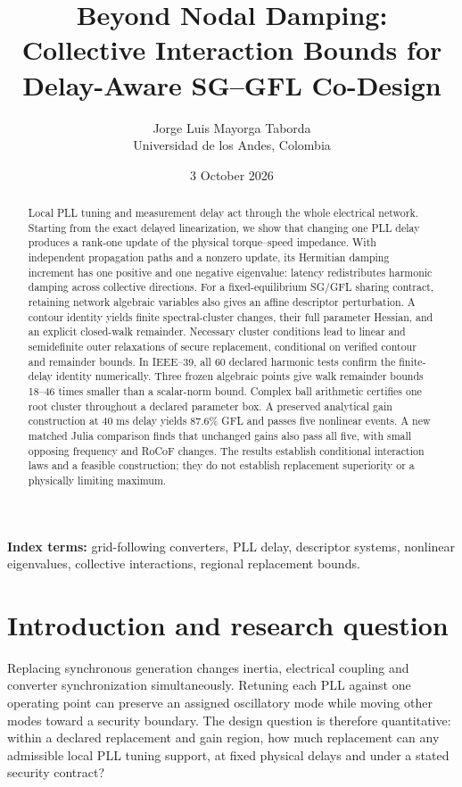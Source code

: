 \documentclass[11pt]{article}
\title{Beyond Nodal Damping:\\Collective Interaction Bounds for Delay-Aware SG--GFL Co-Design}
\author{Jorge Luis Mayorga Taborda\\Universidad de los Andes, Colombia}
\date{3 October 2026}
\begin{document}
\maketitle
\begin{abstract}
Local PLL tuning and measurement delay act through the whole electrical
network. Starting from the exact delayed linearization, we show that
changing one PLL delay produces a rank-one update of the physical
torque--speed impedance. With independent propagation paths and a
nonzero update, its Hermitian damping increment has one positive
and one negative eigenvalue: latency redistributes harmonic damping
across collective directions.
For a fixed-equilibrium SG/GFL sharing contract, retaining network
algebraic variables also gives an affine descriptor perturbation.
A contour identity yields finite spectral-cluster changes, their full
parameter Hessian, and an explicit closed-walk remainder.
Necessary cluster conditions lead to linear and semidefinite outer
relaxations of secure replacement, conditional on verified contour
and remainder bounds.
In IEEE--39, all 60 declared harmonic tests confirm the finite-delay
identity numerically. Three frozen algebraic points give walk remainder
bounds 18--46 times smaller than a scalar-norm bound. Complex ball
arithmetic certifies one root cluster throughout a declared parameter box.
A preserved analytical gain construction at 40 ms delay yields 87.6\%
GFL and passes five nonlinear events. A new matched Julia comparison
finds that unchanged gains also pass all five, with small opposing
frequency and RoCoF changes. The results establish conditional
interaction laws and a feasible construction; they do not establish
replacement superiority or a physically limiting maximum.
\end{abstract}
\noindent\textbf{Index terms:} grid-following converters, PLL delay,
descriptor systems, nonlinear eigenvalues, collective interactions,
regional replacement bounds.

\section{Introduction and research question}
Replacing synchronous generation changes inertia, electrical coupling
and converter synchronization simultaneously. Retuning each PLL against
one operating point can preserve an assigned oscillatory mode while
moving other modes toward a security boundary. The design question is
therefore quantitative: within a declared replacement and gain region,
how much replacement can any admissible local PLL tuning support,
at fixed physical delays and under a stated security contract?
\end{document}
